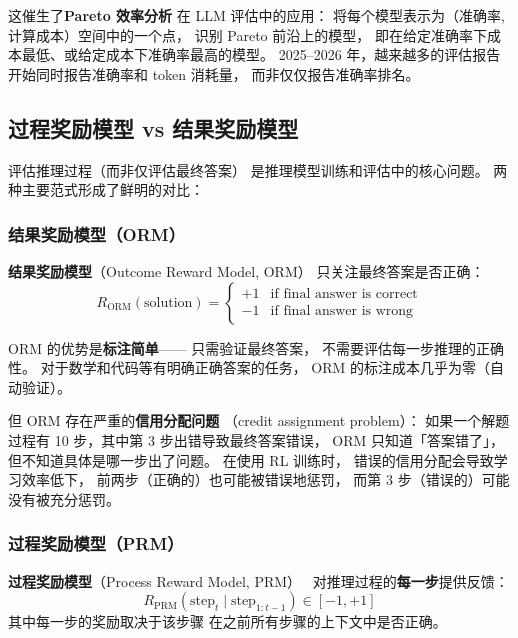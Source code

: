 这催生了\textbf{Pareto 效率分析}
在 LLM 评估中的应用：
将每个模型表示为（准确率, 计算成本）空间中的一个点，
识别 Pareto 前沿上的模型，
即在给定准确率下成本最低、或给定成本下准确率最高的模型。
2025--2026 年，越来越多的评估报告
开始同时报告准确率和 token 消耗量，
而非仅仅报告准确率排名。

\subsection{过程奖励模型 vs 结果奖励模型}
\label{subsec:prm-vs-orm}

评估推理过程（而非仅评估最终答案）
是推理模型训练和评估中的核心问题。
两种主要范式形成了鲜明的对比：

\subsubsection{结果奖励模型（ORM）}

\textbf{结果奖励模型}（Outcome Reward Model, ORM）
只关注最终答案是否正确：
\begin{equation}
  R_{\text{ORM}}(\text{solution}) =
  \begin{cases}
    +1 & \text{if final answer is correct} \\
    -1 & \text{if final answer is wrong}
  \end{cases}
  \label{eq:orm}
\end{equation}

ORM 的优势是\textbf{标注简单}——
只需验证最终答案，
不需要评估每一步推理的正确性。
对于数学和代码等有明确正确答案的任务，
ORM 的标注成本几乎为零（自动验证）。

但 ORM 存在严重的\textbf{信用分配问题}
（credit assignment problem）：
如果一个解题过程有 10 步，其中第 3 步出错导致最终答案错误，
ORM 只知道「答案错了」，
但不知道具体是哪一步出了问题。
在使用 RL 训练时，
错误的信用分配会导致学习效率低下，
前两步（正确的）也可能被错误地惩罚，
而第 3 步（错误的）可能没有被充分惩罚。

\subsubsection{过程奖励模型（PRM）}

\textbf{过程奖励模型}（Process Reward Model, PRM）~\cite{lightman2024lets}
对推理过程的\textbf{每一步}提供反馈：
\begin{equation}
  R_{\text{PRM}}(\text{step}_t \mid \text{step}_{1:t-1}) \in [-1, +1]
  \label{eq:prm}
\end{equation}
其中每一步的奖励取决于该步骤
在之前所有步骤的上下文中是否正确。

